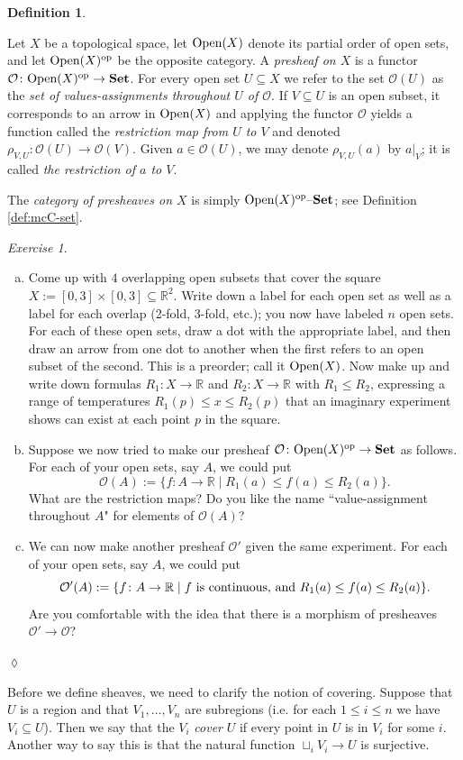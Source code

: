 \documentclass{book}
\def\tn{\textnormal}
\def\mc{\mathcal}
\def\RR{{\mathbb R}}
\def\Op{\tn{Open}}
\def\to{\rightarrow}
\def\taking{\colon}
\def\ss{\subseteq}
\def\|{{\;|\;}}
\def\op{^\tn{op}}
\def\Set{{\bf Set}}
\def\set{{\text \textendash}{\bf Set}}
\def\mcO{\mc{O}}
\theoremstyle{remark}
\newtheorem{exc}[subsubsection]{Exercise}
\newenvironment{exercise}{\begin{exc}}{\hspace*{\fill}$\lozenge$\end{exc}}
\theoremstyle{definition}
\newtheorem{definition}[subsubsection]{Definition}
\def\sexc{\begin{enumerate}[a.)]\setlength{\itemsep}{.1cm}\setlength{\parskip}{.1cm}\item}
\def\next{\item}
\def\endsexc{\end{enumerate}}
\begin{document}
\begin{definition}\label{def:presheaf}

Let $X$ be a topological space, let $\Op(X)$ denote its partial order of open sets, and let $\Op(X)\op$ be the opposite category. A {\em presheaf on $X$} is a functor $\mcO\taking\Op(X)\op\to\Set$. For every open set $U\ss X$ we refer to the set $\mcO(U)$ as the {\em set of values-assignments throughout $U$ of $\mcO$}. If $V\ss U$ is an open subset, it corresponds to an arrow in $\Op(X)$ and applying the functor $\mcO$ yields a function called the {\em restriction map from $U$ to $V$} and denoted $\rho_{V,U}\taking\mcO(U)\to\mcO(V)$. Given $a\in\mcO(U)$, we may denote $\rho_{V,U}(a)$ by $a|_V$; it is called {\em the restriction of $a$ to $V$}.

The {\em category of presheaves on $X$} is simply $\Op(X)\op\set$; see Definition \ref{def:mcC-set}.

\end{definition}

\begin{exercise}~
\sexc Come up with $4$ overlapping open subsets that cover the square $X:=[0,3]\times[0,3]\ss\RR^2$. Write down a label for each open set as well as a label for each overlap (2-fold, 3-fold, etc.); you now have labeled $n$ open sets. For each of these open sets, draw a dot with the appropriate label, and then draw an arrow from one dot to another when the first refers to an open subset of the second. This is a preorder; call it $\Op(X)$. Now make up and write down formulas $R_1\taking X\to\RR$ and $R_2\taking X\to\RR$ with $R_1\leq R_2$, expressing a range of temperatures $R_1(p)\leq x\leq R_2(p)$ that an imaginary experiment shows can exist at each point $p$ in the square. 
\next Suppose we now tried to make our presheaf $\mcO\taking\Op(X)\op\to\Set$ as follows. For each of your open sets, say $A$, we could put $$\mcO(A):=\{f\taking A\to\RR\|R_1(a)\leq f(a)\leq R_2(a)\}.$$ What are the restriction maps? Do you like the name ``value-assignment throughout $A$" for elements of $\mcO(A)$? 
\next We can now make another presheaf $\mcO'$ given the same experiment. For each of your open sets, say $A$, we could put $$\mcO'(A):=\{f\taking A\to\RR\|f\tn{ is continuous, and }R_1(a)\leq f(a)\leq R_2(a)\}.$$ Are you comfortable with the idea that there is a morphism of presheaves $\mcO'\to\mcO$?
\endsexc
\end{exercise}

Before we define sheaves, we need to clarify the notion of covering. Suppose that $U$ is a region and that $V_1,\ldots,V_n$ are subregions (i.e. for each $1\leq i\leq n$ we have $V_i\ss U$). Then we say that the $V_i$ {\em cover} $U$ if every point in $U$ is in $V_i$ for some $i$. Another way to say this is that the natural function $\sqcup_iV_i\to U$ is surjective.
\end{document}
